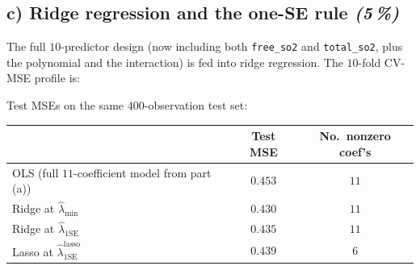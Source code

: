 \documentclass[11pt,a4paper]{article}
\newcommand{\subpoints}[1]{\textit{(#1\,\%)}}
\begin{document}
\subsection*{c) Ridge regression and the one-SE rule \subpoints{5}}

The full $10$-predictor design (now including both \texttt{free\_so2} and \texttt{total\_so2}, plus the polynomial and the interaction) is fed into ridge regression. The $10$-fold CV-MSE profile is:

\begin{center}
\end{center}

\noindent Test MSEs on the same $400$-observation test set:
\begin{center}\small
\begin{tabular}{lcc}
\toprule
 & \textbf{Test MSE} & \textbf{No.\ nonzero coef's} \\
\midrule
OLS (full $11$-coefficient model from part (a))    & $0.453$ & $11$ \\
Ridge at $\hat\lambda_{\min}$                      & $0.430$ & $11$ \\
Ridge at $\hat\lambda_{1\mathrm{SE}}$              & $0.435$ & $11$ \\
Lasso at $\hat\lambda_{1\mathrm{SE}}^{\mathrm{lasso}}$ & $0.439$ & $6$ \\
\bottomrule
\end{tabular}
\end{center}
\end{document}
